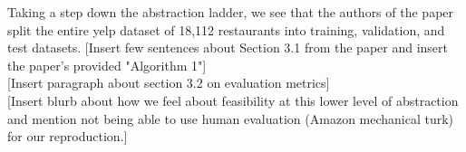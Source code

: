 \documentclass{article}
\begin{document}
    Taking a step down the abstraction ladder, we see that the authors of the paper split the entire yelp dataset of 18,112 restaurants into training, validation, and test datasets.
    [Insert few sentences about Section 3.1 from the paper and insert the paper's provided "Algorithm 1"] \\

    [Insert paragraph about section 3.2 on evaluation metrics] \\

    [Insert blurb about how we feel about feasibility at this lower level of abstraction and mention not being able to use human evaluation (Amazon mechanical turk) for our reproduction.]

    
\end{document}
